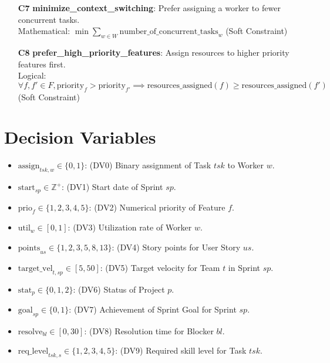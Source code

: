 \documentclass[11pt]{article}
\begin{document}
\begin{itemize}
    \item[\textbf{C7}] \textbf{minimize\_context\_switching}: Prefer assigning a worker to fewer concurrent tasks.
    \\ Mathematical: $\min \sum_{w \in W} \text{number\_of\_concurrent\_tasks}_w$ (Soft Constraint)
    \item[\textbf{C8}] \textbf{prefer\_high\_priority\_features}: Assign resources to higher priority features first.
    \\ Logical: $\forall f, f' \in F, \text{priority}_f > \text{priority}_{f'} \implies \text{resources\_assigned}(f) \geq \text{resources\_assigned}(f')$ (Soft Constraint)
\end{itemize}

\section{Decision Variables}
\begin{itemize}[label=--]
    \item $\text{assign}_{tsk, w} \in \{0, 1\}$: (DV0) Binary assignment of Task $tsk$ to Worker $w$.
    \item $\text{start}_{sp} \in \mathbb{Z}^+$: (DV1) Start date of Sprint $sp$.
    \item $\text{prio}_{f} \in \{1, 2, 3, 4, 5\}$: (DV2) Numerical priority of Feature $f$.
    \item $\text{util}_{w} \in [0, 1]$: (DV3) Utilization rate of Worker $w$.
    \item $\text{points}_{us} \in \{1, 2, 3, 5, 8, 13\}$: (DV4) Story points for User Story $us$.
    \item $\text{target\_vel}_{t, sp} \in [5, 50]$: (DV5) Target velocity for Team $t$ in Sprint $sp$.
    \item $\text{stat}_{p} \in \{0, 1, 2\}$: (DV6) Status of Project $p$.
    \item $\text{goal}_{sp} \in \{0, 1\}$: (DV7) Achievement of Sprint Goal for Sprint $sp$.
    \item $\text{resolve}_{bl} \in [0, 30]$: (DV8) Resolution time for Blocker $bl$.
    \item $\text{req\_level}_{tsk, s} \in \{1, 2, 3, 4, 5\}$: (DV9) Required skill level for Task $tsk$.
\end{itemize}
\end{document}
